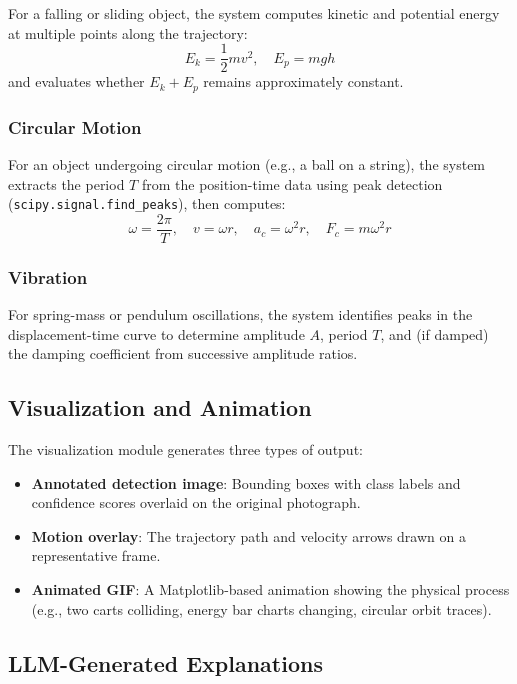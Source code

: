 \documentclass[12pt]{article}
\begin{document}
For a falling or sliding object, the system computes kinetic and potential energy at multiple points along the trajectory:
\[
E_k = \frac{1}{2}mv^2, \quad E_p = mgh
\]
and evaluates whether $E_k + E_p$ remains approximately constant.

\subsubsection{Circular Motion}

For an object undergoing circular motion (e.g., a ball on a string), the system extracts the period $T$ from the position-time data using peak detection (\texttt{scipy.signal.find\_peaks}), then computes:
\[
\omega = \frac{2\pi}{T}, \quad v = \omega r, \quad a_c = \omega^2 r, \quad F_c = m \omega^2 r
\]

\subsubsection{Vibration}

For spring-mass or pendulum oscillations, the system identifies peaks in the displacement-time curve to determine amplitude $A$, period $T$, and (if damped) the damping coefficient from successive amplitude ratios.

\subsection{Visualization and Animation}

The visualization module generates three types of output:

\begin{itemize}[noitemsep]
  \item \textbf{Annotated detection image}: Bounding boxes with class labels and confidence scores overlaid on the original photograph.
  \item \textbf{Motion overlay}: The trajectory path and velocity arrows drawn on a representative frame.
  \item \textbf{Animated GIF}: A Matplotlib-based animation showing the physical process (e.g., two carts colliding, energy bar charts changing, circular orbit traces).
\end{itemize}

\subsection{LLM-Generated Explanations}
\end{document}
